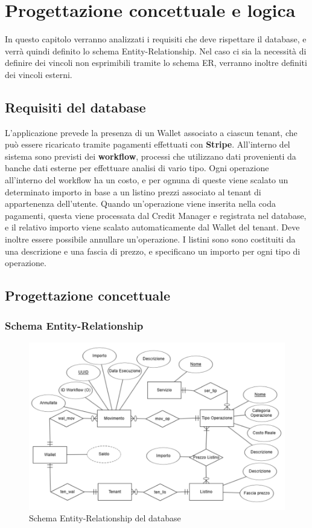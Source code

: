 \chapter{Progettazione concettuale e logica}
In questo capitolo verranno analizzati i requisiti che deve rispettare il database, e verr\`a quindi definito lo schema Entity-Relationship. Nel caso ci sia la necessit\`a
di definire dei vincoli non esprimibili tramite lo schema ER, verranno inoltre definiti dei vincoli esterni.
\section{Requisiti del database}
L'applicazione prevede la presenza di un Wallet associato a ciascun tenant, che pu\`o essere ricaricato tramite pagamenti effettuati con \textbf{Stripe}.
All'interno del sistema sono previsti dei \textbf{workflow}, processi che utilizzano dati provenienti da banche dati esterne per effettuare analisi di vario tipo.
Ogni operazione all'interno del workflow ha un costo, e per ognuna di queste viene scalato un determinato importo in base a un listino prezzi associato al tenant di appartenenza dell'utente.
Quando un'operazione viene inserita nella coda pagamenti, questa viene processata dal Credit Manager e registrata nel database, e il relativo importo viene scalato automaticamente dal Wallet del tenant.
Deve inoltre essere possibile annullare un'operazione. I listini sono sono costituiti da una descrizione e una fascia di prezzo, e specificano un importo per ogni tipo di operazione.

\section{Progettazione concettuale}
\subsection{Schema Entity-Relationship}
\begin{figure}[H]
  \centering
  \includegraphics[width=12cm]{images/er-diagram-concept.png}
  \caption{Schema Entity-Relationship del database}
\end{figure}

